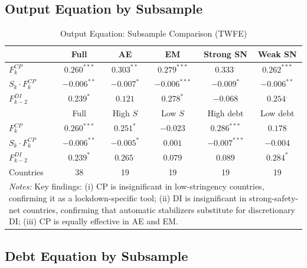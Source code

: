 \documentclass[12pt, a4paper]{article}
\begin{document}
\subsection{Output Equation by Subsample}

\begin{table}[htbp]
\centering
\caption{Output Equation: Subsample Comparison (TWFE)}
\label{tab:sub_output}
\small
\begin{tabular}{lccccc}
\toprule
 & Full & AE & EM & Strong SN & Weak SN \\
\midrule
$F_k^{CP}$
  & $0.260^{***}$ & $0.303^{**}$ & $0.279^{***}$ & $0.333^{.}$ & $0.262^{***}$ \\
$S_k \cdot F_k^{CP}$
  & $-0.006^{**}$ & $-0.007^{*}$ & $-0.006^{***}$ & $-0.009^{*}$ & $-0.006^{**}$ \\
$F_{k-2}^{DI}$
  & $0.239^{*}$ & $0.121$ & $0.278^{*}$ & $-0.068$ & $0.254^{.}$ \\
\midrule
 & Full & High $S$ & Low $S$ & High debt & Low debt \\
\midrule
$F_k^{CP}$
  & $0.260^{***}$ & $0.251^{*}$ & $-0.023$ & $0.286^{***}$ & $0.178$ \\
$S_k \cdot F_k^{CP}$
  & $-0.006^{**}$ & $-0.005^{*}$ & $0.001$ & $-0.007^{***}$ & $-0.004$ \\
$F_{k-2}^{DI}$
  & $0.239^{*}$ & $0.265^{.}$ & $0.079$ & $0.089$ & $0.284^{*}$ \\
\midrule
Countries & 38 & 19 & 19 & 19 & 19 \\
\bottomrule
\multicolumn{6}{p{13cm}}{\footnotesize \textit{Notes:} Key findings: (i) CP is insignificant in low-stringency countries, confirming it as a lockdown-specific tool; (ii) DI is insignificant in strong-safety-net countries, confirming that automatic stabilizers substitute for discretionary DI; (iii) CP is equally effective in AE and EM.} \\
\end{tabular}
\end{table}


\subsection{Debt Equation by Subsample}
\end{document}
